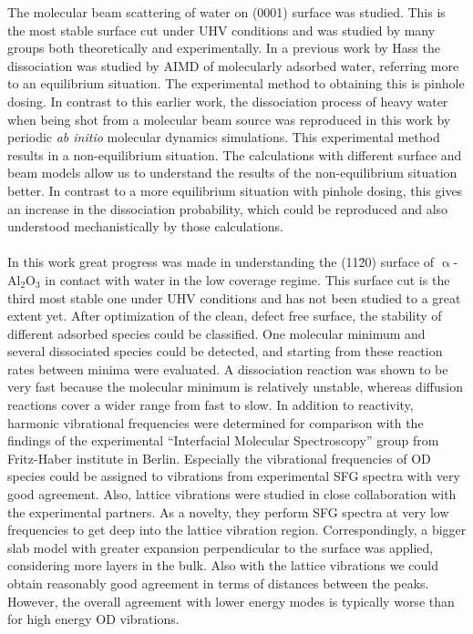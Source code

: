 \documentclass[11pt,DIV=13,BCOR=5mm,a4paper,headinclude]{scrbook}
\begin{document}
The molecular beam scattering of water on (0001) surface was studied.
This is the most stable surface cut under UHV conditions and was studied by many groups both theoretically and experimentally.
In a previous work by Hass the dissociation was studied by AIMD of molecularly adsorbed water, referring more to an equilibrium situation.
The experimental method to obtaining this is pinhole dosing.
In contrast to this earlier work, the dissociation process of heavy water when being shot from a molecular beam source was reproduced in this work by periodic \textit{ab initio} molecular dynamics simulations.
This experimental method results in a non-equilibrium situation.
The calculations with different surface and beam models allow us to understand the results of the non-equilibrium situation better.
In contrast to a more equilibrium situation with pinhole dosing, this gives an increase in the dissociation probability, which could be reproduced and also understood mechanistically by those calculations.
\\\\
In this work great progress was made in understanding the (11\=20) surface of $\upalpha$-Al$_2$O$_3$ in contact with water in the low coverage regime.
This surface cut is the third most stable one under UHV conditions and has not been studied to a great extent yet.
After optimization of the clean, defect free surface, the stability of different adsorbed species could be classified.
One molecular minimum and several dissociated species could be detected, and starting from these reaction rates between minima were evaluated.
A dissociation reaction was shown to be very fast because the molecular minimum is relatively unstable, whereas diffusion reactions cover a wider range from fast to slow.
In addition to reactivity, harmonic vibrational frequencies were determined for comparison with the findings of the experimental ``Interfacial Molecular Spectroscopy'' group  from Fritz-Haber institute in Berlin.
Especially the vibrational frequencies of OD species could be assigned to vibrations from experimental SFG spectra with very good agreement.
Also, lattice vibrations were studied in close collaboration with the experimental partners.
As a novelty, they perform SFG spectra at very low frequencies to get deep into the lattice vibration region.
Correspondingly, a bigger slab model with greater expansion perpendicular to the surface was applied, considering more layers in the bulk.
Also with the lattice vibrations we could obtain reasonably good agreement in terms of distances between the peaks.
However, the overall agreement with lower energy modes is typically worse than for high energy OD vibrations.
\end{document}
